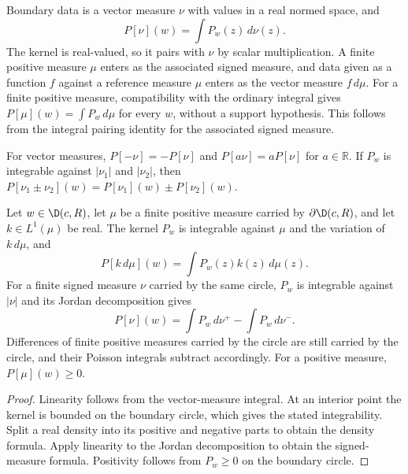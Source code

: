 \begin{definition}
  \label{def:poisson_integral}
  \leanok
  Boundary data is a vector measure $\nu$ with values in a real normed space,
  and
  \[
    P[\nu](w)=\int P_w(z)\,d\nu(z).
  \]
  The kernel is real-valued, so it pairs with $\nu$ by scalar multiplication.
  A finite positive measure $\mu$ enters as the associated signed measure, and
  data given as a function $f$ against a reference measure $\mu$ enters as the
  vector measure $f\,d\mu$. For a finite positive measure, compatibility with
  the ordinary integral gives $P[\mu](w)=\int P_w\,d\mu$ for every $w$, without
  a support hypothesis. This follows from the integral pairing identity for
  the associated signed measure.
\end{definition}

\begin{lemma}
  \label{lem:poisson_integral_linear}
  \leanok
  For vector measures, $P[-\nu]=-P[\nu]$ and $P[a\nu]=aP[\nu]$ for
  $a\in\mathbb R$. If $P_w$ is integrable against $|\nu_1|$ and $|\nu_2|$, then
  $P[\nu_1\pm\nu_2](w)=P[\nu_1](w)\pm P[\nu_2](w)$.

  Let $w\in\D(c,R)$, let $\mu$ be a finite positive measure carried by
  $\partial\D(c,R)$, and let $k\in L^1(\mu)$ be real. The kernel $P_w$ is
  integrable against $\mu$ and the variation of $k\,d\mu$, and
  \[
    P[k\,d\mu](w)=\int P_w(z)k(z)\,d\mu(z).
  \]
  For a finite signed measure $\nu$ carried by the same circle, $P_w$ is
  integrable against $|\nu|$ and its Jordan decomposition gives
  \[
    P[\nu](w)=\int P_w\,d\nu^+-\int P_w\,d\nu^-.
  \]
  Differences of finite positive measures carried by the circle are still
  carried by the circle, and their Poisson integrals subtract accordingly.
  For a positive measure, $P[\mu](w)\ge0$.
  \begin{proof}
    \leanok
    Linearity follows from the vector-measure integral. At an interior point
    the kernel is bounded on the boundary circle, which gives the stated
    integrability. Split a real density into its positive and negative parts
    to obtain the density formula. Apply linearity to the Jordan decomposition
    to obtain the signed-measure formula. Positivity follows from $P_w\ge0$
    on the boundary circle.
  \end{proof}
\end{lemma}

